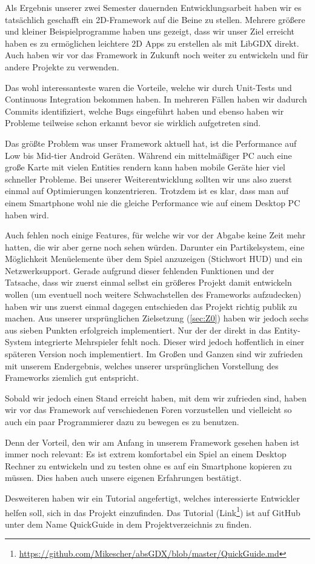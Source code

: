 Als Ergebnis unserer zwei Semester dauernden Entwicklungsarbeit haben wir es tatsächlich geschafft ein 2D-Framework auf die Beine zu stellen.
Mehrere größere und kleiner Beispielprogramme haben uns gezeigt, dass wir unser Ziel erreicht haben es zu ermöglichen leichtere 2D Apps zu erstellen als mit LibGDX direkt.
Auch haben wir vor das Framework in Zukunft noch weiter zu entwickeln und für andere Projekte zu verwenden.

Das wohl interessanteste waren die Vorteile, welche wir durch Unit-Tests und Continuous Integration bekommen haben. In mehreren Fällen haben wir dadurch Commits identifiziert, welche Bugs eingeführt haben und ebenso haben wir Probleme teilweise schon erkannt bevor sie wirklich aufgetreten sind.

Das größte Problem was unser Framework aktuell hat, ist die Performance auf Low bis Mid-tier Android Geräten. Während ein mittelmäßiger PC auch eine große Karte mit vielen Entities rendern kann haben mobile Geräte hier viel schneller Probleme. Bei unserer Weiterentwicklung sollten wir uns also zuerst einmal auf Optimierungen konzentrieren. Trotzdem ist es klar, dass man auf einem Smartphone wohl nie die gleiche Performance wie auf einem Desktop PC haben wird.

Auch fehlen noch einige Features, für welche wir vor der Abgabe keine Zeit mehr hatten, die wir aber gerne noch sehen würden. Darunter ein Partikelsystem, eine Möglichkeit Menüelemente über dem Spiel anzuzeigen (Stichwort HUD) und ein Netzwerksupport. Gerade aufgrund dieser fehlenden Funktionen und der Tatsache, dass wir zuerst einmal selbst ein größeres Projekt damit entwickeln wollen (um eventuell noch weitere Schwachstellen des Frameworks aufzudecken) haben wir uns zuerst einmal dagegen entschieden das Projekt richtig publik zu machen. 
Aus unserer ursprünglichen Zielsetzung (\ref{sec:Z0}) haben wir jedoch sechs aus sieben Punkten erfolgreich implementiert. Nur der der direkt in das Entity-System integrierte Mehrspieler fehlt noch. Dieser wird jedoch hoffentlich in einer späteren Version noch implementiert. Im Großen und Ganzen sind wir zufrieden mit unserem Endergebnis, welches unserer ursprünglichen Vorstellung des Frameworks ziemlich gut entspricht.

Sobald wir jedoch einen Stand erreicht haben, mit dem wir zufrieden sind, haben wir vor das Framework auf verschiedenen Foren vorzustellen und vielleicht so auch ein paar Programmierer dazu zu bewegen es zu benutzen.

Denn der Vorteil, den wir am Anfang in unserem Framework gesehen haben ist immer noch relevant: Es ist extrem komfortabel ein Spiel an einem Desktop Rechner zu entwickeln und zu testen ohne es auf ein Smartphone kopieren zu müssen. Dies haben auch unsere eigenen Erfahrungen bestätigt. 

Desweiteren haben wir ein Tutorial angefertigt, welches interessierte Entwickler helfen soll, sich in das Projekt einzufinden. Das Tutorial (Link\footnote{\url{https://github.com/Mikescher/absGDX/blob/master/QuickGuide.md}}) ist auf GitHub unter dem Name QuickGuide in dem Projektverzeichnis zu finden. 
